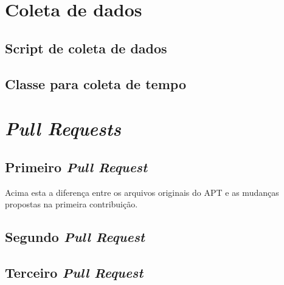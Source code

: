 \begin{apendicesenv}

\partapendices

\chapter{Coleta de dados} %
\label{cha:coleta_de_dados}

\section{Script de coleta de dados}
	

\section{Classe para coleta de tempo}
	


\chapter{\textit{Pull Requests}}
\label{cha:pull_requests}

\section{Primeiro \textit{Pull Request}}
\label{sec:primeiro_pr}
	

Acima esta a diferença entre os arquivos originais do {\code APT} e as mudanças propostas na primeira contribuição.


\section{Segundo \textit{Pull Request}}
\label{sec:segundo_pr}
	


\section{Terceiro \textit{Pull Request}}
\label{sec:segundo_pr}
	




\end{apendicesenv}

